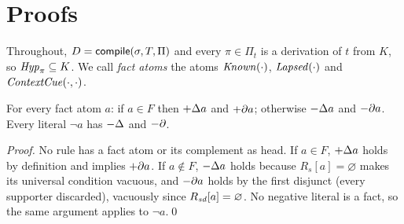 \section{Proofs}
\label{app:proofs}

Throughout, $D=\mathsf{compile}(\sigma,T,\Pi)$ and every $\pi\in\Pi_t$ is a derivation of $t$ from $K$, so $\mathit{Hyp}_\pi\subseteq K$. We call \emph{fact atoms} the atoms $\mathit{Known}(\cdot)$, $\mathit{Lapsed}(\cdot)$ and $\mathit{ContextCue}(\cdot,\cdot)$.

\begin{lemma}\label{lem:facts}
For every fact atom $a$: if $a\in F$ then $+\Delta a$ and $+\partial a$; otherwise $-\Delta a$ and $-\partial a$. Every literal $\neg a$ has $-\Delta$ and $-\partial$.
\end{lemma}
\begin{proof}
No rule has a fact atom or its complement as head. If $a\in F$, $+\Delta a$ holds by definition and implies $+\partial a$. If $a\notin F$, $-\Delta a$ holds because $R_s[a]=\varnothing$ makes its universal condition vacuous, and $-\partial a$ holds by the first disjunct (every supporter discarded), vacuously since $R_{\mathit{sd}}[a]=\varnothing$. No negative literal is a fact, so the same argument applies to $\neg a$.\qed
\end{proof}

